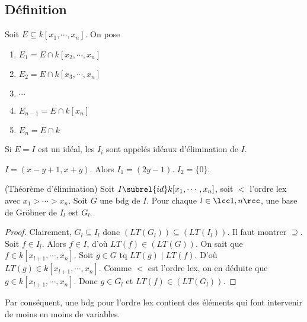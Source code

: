         \subsection{Définition}
            \begin{defi}
                Soit $E \subseteq k[x_1, \cdots, x_n]$. On pose
                \begin{enumerate}
                    \item $E_1 = E \cap k[x_2, \cdots, x_n]$
                    \item $E_2 = E \cap k[x_3, \cdots, x_n]$
                    \item $\cdots$
                    \item $E_{n-1} = E \cap k[x_n]$
                    \item $E_n = E \cap k$
                \end{enumerate}
                Si $E = I$ est un idéal, les $I_i$ sont appelés idéaux d'élimination de $I$.
            \end{defi}
            \begin{expl}
                $I = (x-y+1, x+y)$. Alors $I_1 = (2y - 1)$. $I_2 = \{0\}$.
            \end{expl}
            \begin{theo} (Théorème d'élimination)
                Soit $I \subrel{id} k[x_1, \cdots, x_n]$, soit $<$ l'ordre lex avec $x_1 > \cdots > x_n$. Soit $G$ une bdg de $I$. Pour chaque $l \in \lcc 1,n \rcc$, une base de Gröbner de $I_l$ est $G_l$.
            \end{theo}
            \begin{proof}
                Clairement, $G_l \subseteq I_l$ donc $(LT(G_l)) \subseteq (LT(I_l))$. Il faut montrer $\supseteq$. Soit $f \in I_l$. Alors $f \in I$, d'où $LT(f) \in (LT(G))$. On sait que $f \in k[x_{l+1}, \cdots, x_n]$. Soit $g \in G$ tq $LT(g) \mid LT(f)$. D'où $LT(g) \in k[x_{l+1}, \cdots, x_n]$. Comme $<$ est l'ordre lex, on en déduite que $g \in k[x_{l+1}, \cdots, x_n]$. Donc $g \in G_l$ et $LT(f) \in (LT(G_l))$.
            \end{proof}
            Par conséquent, une bdg pour l'ordre lex contient des éléments qui font intervenir de moins en moins de variables.

